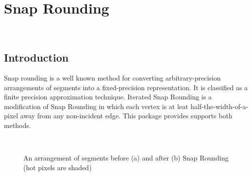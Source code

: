 
\ccParDims


\chapter{Snap Rounding}
\label{chapterSnapRoundibg}
\\
\newcommand{\reals}{{\rm I\!\hspace{-0.025em} R}}
\def\A{{\cal A}}
\def\S{{\cal S}}

\section{Introduction}
Snap rounding is a well known method for converting
arbitrary-precision arrangements of segments into a fixed-precision
representation. It is classified as a finite precision approximation 
technique. Iterated Snap Rounding is a modification of Snap Rounding in
which each vertex is at leat half-the-width-of-a-pixel away from any
non-incident edge.
This package provides supports both methods.

\begin{figure}
\begin{center}
\  \
\end{center}
\vspace{-2ex}
\caption{An arrangement of segments before (a) and after (b)
Snap Rounding (hot pixels are shaded)}
\label{fig:sr1}
\end{figure}


